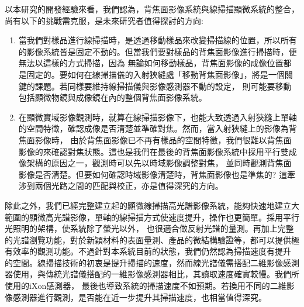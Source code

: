 \documentclass[12pt]{article}
\begin{document}
以本研究的開發經驗來看，我們認為，背焦面影像系統與線掃描顯微系統的整合，尚有以下的挑戰需克服，是未來研究者值得探討的方向:
\begin{enumerate}
    \item 當我們對樣品進行線掃描時，是透過移動樣品來改變掃描線的位置，所以所有的影像系統皆是固定不動的。但當我們要對樣品的背焦面影像進行掃描時，便無法以這樣的方式掃描，因為
    無論如何移動樣品，背焦面影像的成像位置都是固定的。要如何在線掃描儀的入射狹縫處「移動背焦面影像」，將是一個關鍵的課題。若同樣要維持線掃描儀與影像感測器不動的設定，
    則可能要移動包括顯微物鏡與成像鏡在內的整個背焦面影像系統。
    \item 在顯微實域影像觀測時，就算在線掃描影像下，也能大致透過入射狹縫上單軸的空間特徵，確認成像是否清楚並準確對焦。然而，當入射狹縫上的影像為背焦面影像時，
    由於背焦面影像已不再有樣品的空間特徵，我們很難以背焦面影像的來確認對焦狀態。這也是我們在最後的背焦面影像系統中採用平行雙成像架構的原因之一，觀測時可以先以時域影像調整對焦，
    並同時觀測背焦面影像是否清楚。但要如何確認時域影像清楚時，背焦面影像也是準焦的? 這牽涉到兩個光路之間的匹配與校正，亦是值得深究的方向。
\end{enumerate}

除此之外，我們已經完整建立起的顯微線掃描高光譜影像系統，能夠快速地建立大範圍的顯微高光譜影像，單軸的線掃描方式使速度提升，操作也更簡單。採用平行光照明的架構，使系統除了螢光以外，
也很適合做反射光譜的量測。再加上完整的光譜瀏覽功能，對於新穎材料的表面量測、產品的微結構驗證等，都可以提供極有效率的觀測功能。不過針對本系統目前的狀態，我們仍然認為掃描速度有提升
的空間。線掃描技術的初衷是提升掃描的速度，然而線光譜儀需搭配二維影像感測器使用，與傳統光譜儀搭配的一維影像感測器相比，其讀取速度確實較慢。我們所使用的iXon感測器，
最後也導致系統的掃描速度不如預期。若換用不同的二維影像感測器進行觀測，是否能在近一步提升其掃描速度，也相當值得深究。

\printbibliography
\end{document}
